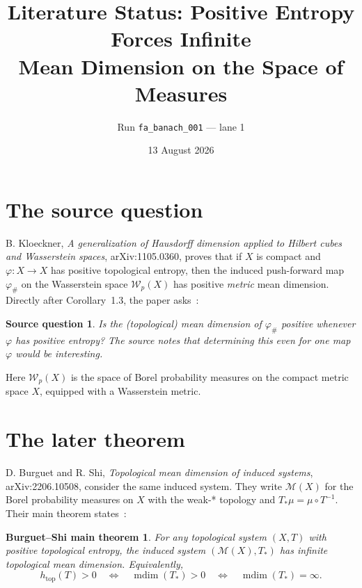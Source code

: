 \documentclass[11pt]{article}
\title{Literature Status: Positive Entropy Forces Infinite\\
Mean Dimension on the Space of Measures}
\author{Run \texttt{fa\_banach\_001} --- lane 1}
\date{13 August 2026}
\newtheorem*{question}{Source question}
\newtheorem*{answer}{Burguet--Shi main theorem}
\begin{document}
\maketitle

\begin{center}
\end{center}

\section{The source question}

B. Kloeckner, \emph{A generalization of Hausdorff dimension applied to
Hilbert cubes and Wasserstein spaces}, arXiv:1105.0360, proves that if
$X$ is compact and $\varphi:X\to X$ has positive topological entropy,
then the induced push-forward map $\varphi_\#$ on the Wasserstein space
$\mathscr W_p(X)$ has positive \emph{metric} mean dimension.  Directly
after Corollary~1.3, the paper asks~\cite{source}:

\begin{question}
Is the (topological) mean dimension of $\varphi_\#$ positive whenever
$\varphi$ has positive entropy?  The source notes that determining this
even for one map $\varphi$ would be interesting.
\end{question}

Here $\mathscr W_p(X)$ is the space of Borel probability measures on the
compact metric space $X$, equipped with a Wasserstein metric.

\section{The later theorem}

D. Burguet and R. Shi, \emph{Topological mean dimension of induced
systems}, arXiv:2206.10508, consider the same induced system.  They write
$\mathcal M(X)$ for the Borel probability measures on $X$ with the
weak-* topology and $T_*\mu=\mu\circ T^{-1}$.  Their main theorem
states~\cite{answerpaper}:

\begin{answer}
For any topological system $(X,T)$ with positive topological entropy,
the induced system $(\mathcal M(X),T_*)$ has infinite topological mean
dimension.  Equivalently,
\[
 h_{\mathrm{top}}(T)>0
 \quad\Longleftrightarrow\quad
 \operatorname{mdim}(T_*)>0
 \quad\Longleftrightarrow\quad
 \operatorname{mdim}(T_*)=\infty.
\]
\end{answer}
\end{document}
